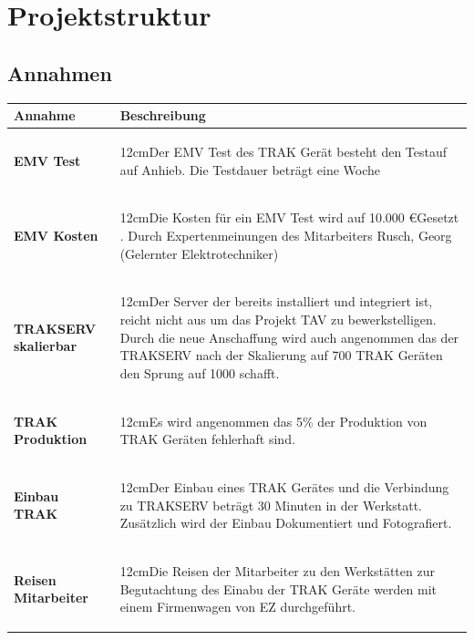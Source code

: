 \documentclass[a4paper,10pt]{scrartcl}
\newcommand\Absatz[2][12cm]{\begin{varwidth}{#1}\flushleft#2\end{varwidth}}
\begin{document}
\newpage

\section{Projektstruktur}
\subsection{Annahmen}
\begin{adjustbox}{width=\textwidth}
\begin{tabular}{ll} 
\toprule
\textbf{Annahme} & \textbf{Beschreibung}\\
\midrule 
\midrule
\textbf{EMV Test}  & {\Absatz{Der EMV Test des TRAK Gerät besteht den Testauf auf Anhieb. Die Testdauer beträgt eine Woche \linebreak}} \\
\midrule
\textbf{EMV Kosten}  & {\Absatz{Die Kosten für ein EMV Test wird auf 10.000 \euro Gesetzt . Durch Expertenmeinungen des Mitarbeiters Rusch, Georg (Gelernter Elektrotechniker) \linebreak}} \\
\midrule
\textbf{TRAKSERV skalierbar}  & {\Absatz{Der Server der bereits installiert und integriert ist, reicht nicht aus um das Projekt TAV zu bewerkstelligen. Durch die neue Anschaffung wird auch angenommen das der TRAKSERV nach der Skalierung auf 700 TRAK Geräten den Sprung auf 1000 schafft.\linebreak}} \\
\midrule
\textbf{TRAK Produktion}  & {\Absatz{Es wird angenommen das 5\% der Produktion von TRAK Geräten fehlerhaft sind.\linebreak}} \\
\midrule
\textbf{Einbau TRAK}  & {\Absatz{Der Einbau eines TRAK Gerätes und die Verbindung zu TRAKSERV beträgt 30 Minuten in der Werkstatt. Zusätzlich wird der Einbau Dokumentiert und Fotografiert. \linebreak}} \\
\midrule
\textbf{Reisen Mitarbeiter}  & {\Absatz{Die Reisen der Mitarbeiter zu den Werkstätten zur Begutachtung des Einabu der TRAK Geräte werden mit einem Firmenwagen von EZ durchgeführt. \linebreak}} \\
\midrule

\end{tabular}
\end{adjustbox}
\end{document}
